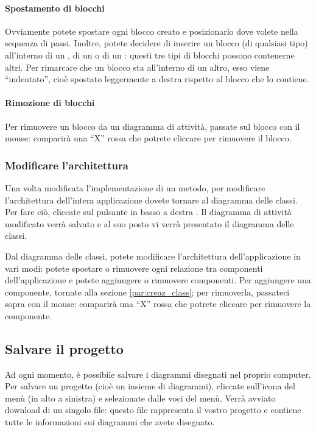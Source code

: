 \paragraph{Spostamento di blocchi} Ovviamente potete spostare ogni blocco creato e posizionarlo dove volete nella sequenza di passi. Inoltre, potete decidere di inserire un blocco (di qualsiasi tipo) all'interno di un , di un  o di un : questi tre tipi di blocchi possono contenerne altri. Per rimarcare che un blocco sta all'interno di un altro, esso viene “indentato”, cioè spostato leggermente a destra rispetto al blocco che lo contiene.

\paragraph{Rimozione di blocchi} Per rimuovere un blocco da un diagramma di attività, passate sul blocco con il mouse: comparirà una “X” rossa che potrete cliccare per rimuovere il blocco.

\subsubsection{Modificare l'architettura}
Una volta modificata l'implementazione di un metodo, per modificare l'architettura dell'intera applicazione dovete tornare al diagramma delle classi. Per fare ciò, cliccate sul pulsante in basso a destra . Il diagramma di attività modificato verrà salvato e al suo posto vi verrà presentato il diagramma delle classi.

Dal diagramma delle classi, potete modificare l'architettura dell'applicazione in vari modi: potete spostare o rimuovere ogni relazione tra componenti dell'applicazione e potete aggiungere o rimuovere componenti. Per aggiungere una componente, tornate alla sezione \ref{par:creaz_class}; per rimuoverla, passateci sopra con il mouse: comparirà una “X” rossa che potrete cliccare per rimuovere la componente.



\subsection{Salvare il progetto} \label{sec:save}

Ad ogni momento, è possibile salvare i diagrammi disegnati nel proprio computer. Per salvare un progetto (cioè un insieme di diagrammi), cliccate sull'icona del menù (in alto a sinistra) e selezionate  dalle voci del menù. Verrà avviato download di un singolo file: questo file rappresenta il vostro progetto e contiene tutte le informazioni sui diagrammi che avete disegnato.



